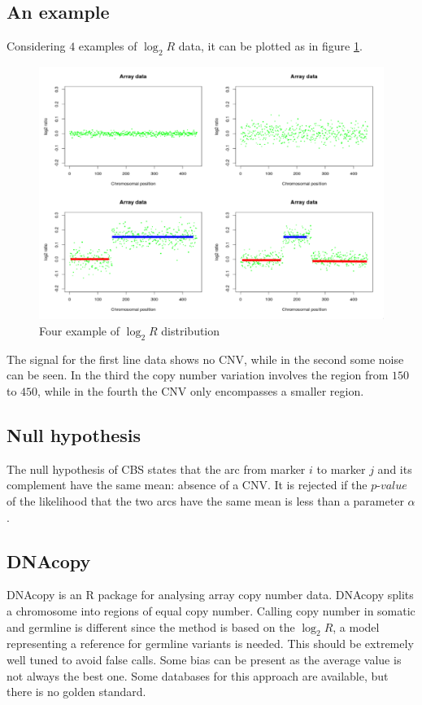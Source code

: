 		\subsection{An example}
		Considering $4$ examples of $\log_2 R$ data, it can be plotted as in figure \ref{fig:cbs}.

		\begin{figure}[H]
			\centering
			\includegraphics[width=\linewidth]{cbs}
			\caption{Four example of $\log_2 R$ distribution}
			\label{fig:cbs}
		\end{figure}

		The signal for the first line data shows no CNV, while in the second some noise can be seen.
		In the third the copy number variation involves the region from $150$ to $450$, while in the fourth the CNV only encompasses a smaller region.

		\subsection{Null hypothesis}
		The null hypothesis of CBS states that the arc from marker $i$ to marker $j$ and its complement have the same mean: absence of a CNV.
		It is rejected if the $p$-$value$ of the likelihood that the two arcs have the same mean is less than a parameter $\alpha$.

		\subsection{DNAcopy}
		DNAcopy is an R package for analysing array copy number data.
		DNAcopy splits a chromosome into regions of equal copy number.
		Calling copy number in somatic and germline is different since the method is based on the $\log_2 R$, a model representing a reference for germline variants is needed.
		This should be extremely well tuned to avoid false calls.
		Some bias can be present as the average value is not always the best one.
		Some databases for this approach are available, but there is no golden standard.


